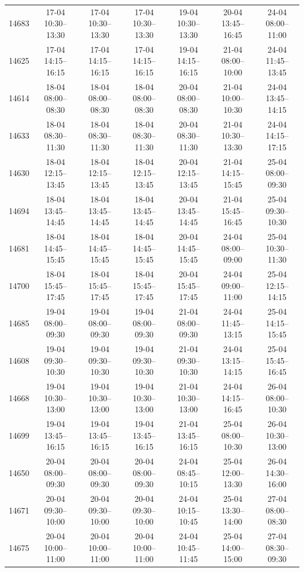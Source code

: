 \begin{table}[htbp]
\begin{tabular}{|r|c|c|c|c|c|c|}
14683 & 17-04 10:30--13:30 & 17-04 10:30--13:30 & 17-04 10:30--13:30 & 19-04 10:30--13:30 & 20-04 13:45--16:45 & 24-04 08:00--11:00 \\ 
14625 & 17-04 14:15--16:15 & 17-04 14:15--16:15 & 17-04 14:15--16:15 & 19-04 14:15--16:15 & 21-04 08:00--10:00 & 24-04 11:45--13:45 \\ 
14614 & 18-04 08:00--08:30 & 18-04 08:00--08:30 & 18-04 08:00--08:30 & 20-04 08:00--08:30 & 21-04 10:00--10:30 & 24-04 13:45--14:15 \\ 
14633 & 18-04 08:30--11:30 & 18-04 08:30--11:30 & 18-04 08:30--11:30 & 20-04 08:30--11:30 & 21-04 10:30--13:30 & 24-04 14:15--17:15 \\ 
14630 & 18-04 12:15--13:45 & 18-04 12:15--13:45 & 18-04 12:15--13:45 & 20-04 12:15--13:45 & 21-04 14:15--15:45 & 25-04 08:00--09:30 \\ 
14694 & 18-04 13:45--14:45 & 18-04 13:45--14:45 & 18-04 13:45--14:45 & 20-04 13:45--14:45 & 21-04 15:45--16:45 & 25-04 09:30--10:30 \\ 
14681 & 18-04 14:45--15:45 & 18-04 14:45--15:45 & 18-04 14:45--15:45 & 20-04 14:45--15:45 & 24-04 08:00--09:00 & 25-04 10:30--11:30 \\ 
14700 & 18-04 15:45--17:45 & 18-04 15:45--17:45 & 18-04 15:45--17:45 & 20-04 15:45--17:45 & 24-04 09:00--11:00 & 25-04 12:15--14:15 \\ 
14685 & 19-04 08:00--09:30 & 19-04 08:00--09:30 & 19-04 08:00--09:30 & 21-04 08:00--09:30 & 24-04 11:45--13:15 & 25-04 14:15--15:45 \\ 
14608 & 19-04 09:30--10:30 & 19-04 09:30--10:30 & 19-04 09:30--10:30 & 21-04 09:30--10:30 & 24-04 13:15--14:15 & 25-04 15:45--16:45 \\ 
14668 & 19-04 10:30--13:00 & 19-04 10:30--13:00 & 19-04 10:30--13:00 & 21-04 10:30--13:00 & 24-04 14:15--16:45 & 26-04 08:00--10:30 \\ 
14699 & 19-04 13:45--16:15 & 19-04 13:45--16:15 & 19-04 13:45--16:15 & 21-04 13:45--16:15 & 25-04 08:00--10:30 & 26-04 10:30--13:00 \\ 
14650 & 20-04 08:00--09:30 & 20-04 08:00--09:30 & 20-04 08:00--09:30 & 24-04 08:45--10:15 & 25-04 12:00--13:30 & 26-04 14:30--16:00 \\ 
14671 & 20-04 09:30--10:00 & 20-04 09:30--10:00 & 20-04 09:30--10:00 & 24-04 10:15--10:45 & 25-04 13:30--14:00 & 27-04 08:00--08:30 \\ 
14675 & 20-04 10:00--11:00 & 20-04 10:00--11:00 & 20-04 10:00--11:00 & 24-04 10:45--11:45 & 25-04 14:00--15:00 & 27-04 08:30--09:30 \\ 

\end{tabular}
\end{table}
